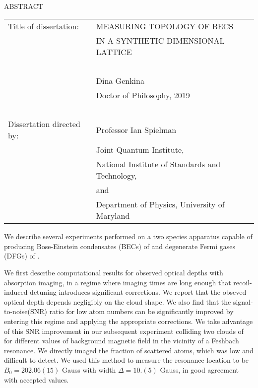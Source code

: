 
\hbox{\ }

\renewcommand{\baselinestretch}{1}
\small \normalsize

\begin{center}
\large{{ABSTRACT}}

\vspace{3em}

\end{center}
\hspace{-.15in}
\begin{tabular}{ll}
Title of dissertation:    & {\large  MEASURING TOPOLOGY OF BECS}\\
&                     {\large IN A SYNTHETIC DIMENSIONAL LATTICE} \\
\ \\
&                          {\large  Dina Genkina} \\
&                           {\large Doctor of Philosophy, 2019} \\
\ \\
Dissertation directed by: & {\large  Professor Ian Spielman} \\
&  				{\large	 Joint Quantum Institute,} \\
&				{\large National Institute of Standards and Technology,}\\
&				{\large and} \\
&				{\large Department of Physics, University of Maryland}
\end{tabular}

\vspace{3em}

\renewcommand{\baselinestretch}{2}
\large \normalsize

We describe several experiments performed on a two species apparatus capable of producing Bose-Einstein condensates (BECs) of \Rb{} and degenerate Fermi gases (DFGs) of \K{}. 

We first describe computational results for observed optical depths with absorption imaging, in a regime where imaging times are long enough that recoil-induced detuning introduces significant corrections. We report that the obseved optical depth depends negligibly on the cloud shape. We also find that the signal-to-noise(SNR) ratio for low atom numbers can be significantly improved by entering this regime and applying the appropriate corrections. We take advantage of this SNR improvement in our subsequent experiment colliding two clouds of \K{} for different values of background magnetic field in the vicinity of a Feshbach resonance. We directly imaged the fraction of scattered atoms, which was low and difficult to detect. We used this method to measure the resonance location to be $B_0 = 202.06(15)$ Gauss with width $\Delta = 10.(5)$ Gauss, in good agreement with accepted values.


